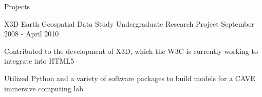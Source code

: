 \documentclass{resume}
\begin{document}
\begin{section}{Projects}
		\begin{project}{X3D Earth Geospatial Data Study}
		               {Undergraduate Research Project}
		               {September 2008 - April 2010} %
			\item Contributed to the development of X3D, which the W3C is currently
			      working to integrate into HTML5
			\item Utilized Python and a variety of software packages to build models
			      for a CAVE immersive computing lab
		\end{project}
	\end{section}
\end{document}
